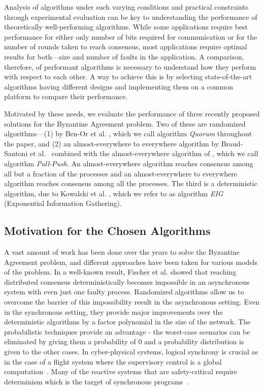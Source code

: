 Analysis of algorithms under such varying conditions and practical constraints
through experimental evaluation can be key to understanding the performance of
theoretically well-performing algorithms.  While some applications require best
performance for either only number of bits required for
communication or for the number of rounds taken to reach consensus, most
applications \cite{YJC} require optimal results for both---size and number of
faults in the application. A comparison, therefore, of performant algorithms is
necessary to understand how they perform with respect to each other. A way to
achieve this is by selecting state-of-the-art algorithms having different
designs and implementing them on a common platform to compare their
performance.

Motivated by these needs, we evaluate the performance of three recently
proposed solutions for the Byzantine Agreement problem. Two of these are
randomized algorithms---(1) by Ben-Or et al. \cite{BPV06}, which we call
algorithm \textit{Quorum} throughout the paper, and (2) an almost-everywhere to
everywhere algorithm by Braud-Santoni et al.~\cite{BGH13} combined with the
almost-everywhere algorithm of \cite{KSSV06}, which we call algorithm
\textit{Pull-Push}. An almost-everywhere algorithm reaches consensus among all
but a fraction of the processes and an almost-everywhere to everywhere
algorithm reaches consensus among all the processes. 
The third is a deterministic algorithm, due to Kowalski et
al. \cite{KM13}, which we refer to as algorithm \textit{EIG} (Exponential
Information Gathering). 

\subsection{Motivation for the Chosen Algorithms}

A vast amount of work has been done over the years to solve the Byzantine
Agreement problem, and different approaches have been taken for various models
of the problem. In a well-known result, Fischer et al. \cite{FischerLP83}
showed that reaching distributed consensus deterministically becomes impossible
in an asynchronous system with even just one faulty process. Randomized
algorithms allow us to overcome the barrier of this impossibility result in the
asynchronous setting. Even in the synchronous setting, they provide major
improvements over the deterministic algorithms by a factor polynomial in the
size of the network. The probabilistic techniques provide an advantage - the
worst-case scenarios can be eliminated by giving them a probability of $0$ and
a probability distribution is given to the other cases. In cyber-physical
systems, logical synchrony is crucial as in the case of a flight system where
the supervisory control is a global computation~\cite{SASMO}.  Many of the
reactive systems that are safety-critical require determinism which is the
target of synchronous programs~\cite{MVF00, LH94}.



